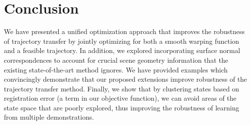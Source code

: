 \documentclass{article}
\begin{document}

\section{Conclusion}

We have presented a unified optimization approach that improves the robustness of trajectory transfer by jointly optimizing for both a smooth warping function and a feasible trajectory. In addition, we explored incorporating surface normal correspondences to account for crucial scene geometry information that the existing state-of-the-art method ignores. We have provided examples which convincingly demonstrate that our proposed extensions improve robustness of the trajectory transfer method. Finally, we show that by clustering states based on registration error (a term in our objective function), we can avoid areas of the state space that are poorly explored, thus improving the robustness of learning from multiple demonstrations.




\end{document}
